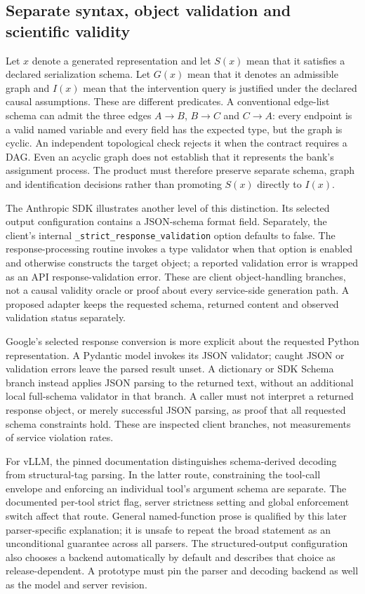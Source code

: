\subsection{Separate syntax, object validation and scientific validity}

Let $x$ denote a generated representation and let $S(x)$ mean that it satisfies
a declared serialization schema. Let $G(x)$ mean that it denotes an admissible
graph and $I(x)$ mean that the intervention query is justified under the
declared causal assumptions. These are different predicates. A conventional
edge-list schema can admit the three edges $A\to B$, $B\to C$ and $C\to A$:
every endpoint is a valid named variable and every field has the expected
type, but the graph is cyclic. An independent topological check rejects it
when the contract requires a DAG. Even an acyclic graph does not establish
that it represents the bank's assignment process. The product must therefore
preserve separate schema, graph and identification decisions rather than
promoting $S(x)$ directly to $I(x)$.
\citep{exec24_backend_reference}

The Anthropic SDK illustrates another level of this distinction. Its selected
output configuration contains a JSON-schema format field. Separately, the
client's internal \texttt{\_strict\_response\_validation} option defaults to
false. The response-processing routine invokes a type validator when that
option is enabled and otherwise constructs the target object; a reported
validation error is wrapped as an API response-validation error. These are
client object-handling branches, not a causal validity oracle or proof about
every service-side generation path. A proposed adapter keeps the requested
schema, returned content and observed validation status separately.
\citep{exec24_backend_anthropic}

Google's selected response conversion is more explicit about the requested
Python representation. A Pydantic model invokes its JSON validator; caught
JSON or validation errors leave the parsed result unset. A dictionary or
SDK Schema branch instead applies JSON parsing to the returned text, without
an additional local full-schema validator in that branch. A caller must
not interpret a returned response object, or merely successful JSON parsing,
as proof that all requested schema constraints hold. These are inspected
client branches, not measurements of service violation rates.
\citep{exec24_backend_google}

For vLLM, the pinned documentation distinguishes schema-derived decoding
from structural-tag parsing. In the latter route, constraining the tool-call
envelope and enforcing an individual tool's argument schema are separate.
The documented per-tool strict flag, server strictness setting and global
enforcement switch affect that route. General named-function prose is
qualified by this later parser-specific explanation; it is unsafe to repeat
the broad statement as an unconditional guarantee across all parsers.
The structured-output configuration also chooses a backend automatically
by default and describes that choice as release-dependent. A prototype must
pin the parser and decoding backend as well as the model and server revision.
\citep{exec24_backend_vllm}

